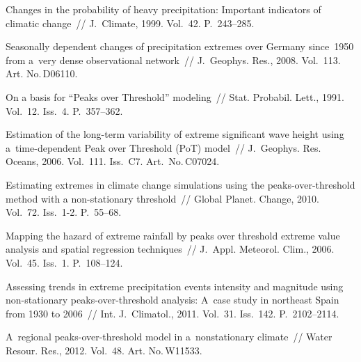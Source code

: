 \begin{multicols}{2}
\vspace*{-6pt}

{\small\frenchspacing
 {%
 \begin{thebibliography}{99}
 
 
 Changes
in the probability of heavy precipitation: Important indicators of climatic change~// 
J.~Climate, 1999. Vol.~42. P.~243--285.

Seasonally dependent changes of precipitation extremes over Germany since~1950 
from a~very dense observational network~// J.~Geophys. Res., 2008. Vol.~113. Art. No.\,D06110.

 On a basis for ``Peaks over Threshold'' modeling~// 
Stat. Probabil. Lett., 1991. Vol.~12. Iss.~4. P.~357--362.

Estimation of the long-term variability of extreme significant wave height 
using a~time-dependent Peak over Threshold (PoT) model~// 
J.~Geophys. Res. Oceans, 2006. Vol.~111. Iss.~C7. Art.\ No.\,C07024.

Estimating extremes in climate change simulations using the 
peaks-over-threshold method with a non-stationary threshold~// 
Global Planet. Change, 2010. Vol.~72. Iss.~1-2. P.~55--68.

Mapping the hazard of extreme rainfall by peaks over threshold 
extreme value analysis and spatial regression techniques~// 
J.~Appl. Meteorol. Clim., 2006. Vol.~45. Iss.~1. P.~108--124.

 Assessing trends in extreme precipitation 
events intensity and magnitude using non-stationary peaks-over-threshold analysis: 
A~case study in northeast Spain from 1930 to 2006~// 
Int. J.~Climatol., 2011. Vol.~31. Iss.~142. P.~2102--2114.

 A~regional peaks-over-threshold model in a~nonstationary climate~// 
Water Resour. Res., 2012. Vol.~48. Art. No.\,W11533.


\end{thebibliography}}}
\end{multicols}
